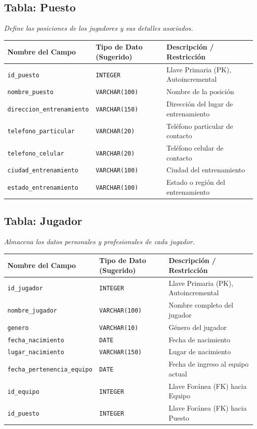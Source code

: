 \documentclass{article}
\begin{document}
\subsection*{Tabla: Puesto}
\textit{Define las posiciones de los jugadores y sus detalles asociados.}
\begin{center}
\begin{tabular}{|l|l|p{6cm}|}
\hline
\textbf{Nombre del Campo} & \textbf{Tipo de Dato (Sugerido)} & \textbf{Descripción / Restricción} \\
\hline
\texttt{id\_puesto} & \texttt{INTEGER} & Llave Primaria (PK), Autoincremental \\
\texttt{nombre\_puesto} & \texttt{VARCHAR(100)} & Nombre de la posición \\
\texttt{direccion\_entrenamiento} & \texttt{VARCHAR(150)} & Dirección del lugar de entrenamiento \\
\texttt{telefono\_particular} & \texttt{VARCHAR(20)} & Teléfono particular de contacto \\
\texttt{telefono\_celular} & \texttt{VARCHAR(20)} & Teléfono celular de contacto \\
\texttt{ciudad\_entrenamiento} & \texttt{VARCHAR(100)} & Ciudad del entrenamiento \\
\texttt{estado\_entrenamiento} & \texttt{VARCHAR(100)} & Estado o región del entrenamiento \\
\hline
\end{tabular}
\end{center}

\subsection*{Tabla: Jugador}
\textit{Almacena los datos personales y profesionales de cada jugador.}
\begin{center}
\begin{tabular}{|l|l|p{6cm}|}
\hline
\textbf{Nombre del Campo} & \textbf{Tipo de Dato (Sugerido)} & \textbf{Descripción / Restricción} \\
\hline
\texttt{id\_jugador} & \texttt{INTEGER} & Llave Primaria (PK), Autoincremental \\
\texttt{nombre\_jugador} & \texttt{VARCHAR(100)} & Nombre completo del jugador \\
\texttt{genero} & \texttt{VARCHAR(10)} & Género del jugador \\
\texttt{fecha\_nacimiento} & \texttt{DATE} & Fecha de nacimiento \\
\texttt{lugar\_nacimiento} & \texttt{VARCHAR(150)} & Lugar de nacimiento \\
\texttt{fecha\_pertenencia\_equipo} & \texttt{DATE} & Fecha de ingreso al equipo actual \\
\texttt{id\_equipo} & \texttt{INTEGER} & Llave Foránea (FK) hacia Equipo \\
\texttt{id\_puesto} & \texttt{INTEGER} & Llave Foránea (FK) hacia Puesto \\
\hline
\end{tabular}
\end{center}
\end{document}
